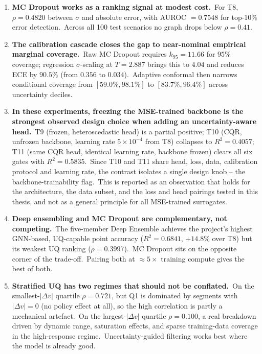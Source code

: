 \begin{enumerate}
 \item \textbf{MC Dropout works as a ranking signal at modest cost.}\ For T8, $\rho = 0.4820$ between $\sigma$ and absolute error, with AUROC $= 0.7548$ for top-10\% error detection.\ Across all 100 test scenarios no graph drops below $\rho = 0.41$.

 \item \textbf{The calibration cascade closes the gap to near-nominal empirical marginal coverage.}\ Raw MC Dropout requires $k_{95} = 11.66$ for $95\%$ coverage; regression $\sigma$-scaling at $T = 2.887$ brings this to $4.04$ and reduces ECE by $90.5\%$ (from $0.356$ to $0.034$).\ Adaptive conformal then narrows conditional coverage from $[59.0\%, 98.1\%]$ to $[83.7\%, 96.4\%]$ across uncertainty deciles.

 \item \textbf{In these experiments, freezing the MSE-trained backbone is the strongest observed design choice when adding an uncertainty-aware head.}\ T9 (frozen, heteroscedastic head) is a partial positive; T10 (CQR, unfrozen backbone, learning rate $5\times10^{-4}$ from T8) collapses to $R^2 = 0.4057$; T11 (same CQR head, identical learning rate, backbone frozen) clears all six gates with $R^2 = 0.5835$.\ Since T10 and T11 share head, loss, data, calibration protocol and learning rate, the contrast isolates a single design knob -- the backbone-trainability flag.\ This is reported as an observation that holds for the architecture, the data subset, and the loss and head pairings tested in this thesis, and not as a general principle for all MSE-trained surrogates.

 \item \textbf{Deep ensembling and MC Dropout are complementary, not competing.}\ The five-member Deep Ensemble achieves the project's highest GNN-based, UQ-capable point accuracy ($R^2 = 0.6841$, $+14.8\%$ over T8) but its weakest UQ ranking ($\rho = 0.3997$).\ MC Dropout sits on the opposite corner of the trade-off.\ Pairing both at $\approx 5\times$ training compute gives the best of both.

 \item \textbf{Stratified UQ has two regimes that should not be conflated.}\ On the smallest-$|\Delta v|$ quartile $\rho = 0.721$, but Q1 is dominated by segments with $|\Delta v| = 0$ (no policy effect at all), so the high correlation is partly a mechanical artefact.\ On the largest-$|\Delta v|$ quartile $\rho = 0.100$, a real breakdown driven by dynamic range, saturation effects, and sparse training-data coverage in the high-response regime.\ Uncertainty-guided filtering works best where the model is already good.
\end{enumerate}

